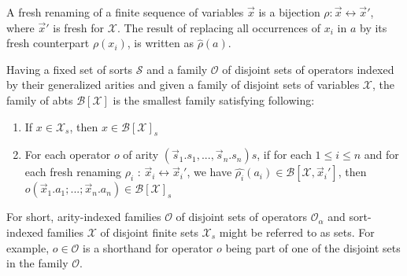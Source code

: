 A fresh renaming of a finite sequence of variables $\vec{x}$ is a bijection $\rho: \vec{x} \leftrightarrow \vec{x}'$, where $\vec{x}'$ is fresh for $\mathcal{X}$. The result of replacing all occurrences of $x_i$ in $a$ by its fresh counterpart $\rho(x_i)$, is written as $\hat{\rho}(a)$.

Having a fixed set of sorts $\mathcal{S}$ and a family $\mathcal{O}$ of disjoint sets of operators indexed by their generalized arities and given a family of disjoint sets of variables $\mathcal{X}$, the family of abts $\mathcal{B}[\mathcal{X}]$ is the smallest family satisfying following:

\begin{enumerate}
    \item If $x \in \mathcal{X}_s$, then $x \in \mathcal{B}[\mathcal{X}]_s$
    \item For each operator $o$ of arity $(\vec{s}_1.s_1,...,\vec{s}_n.s_n)s$, if for each $1 \leq i \leq n$ and for each fresh renaming $\rho_i$ : $\vec{x}_i \leftrightarrow \vec{x}_i'$, we have $\hat{\rho_i}(a_i) \in \mathcal{B}[\mathcal{X}, \vec{x}_i']$, then $o(\vec{x}_1.a_1;...;\vec{x}_n.a_n) \in \mathcal{B}[\mathcal{X}]_s$
\end{enumerate}

For short, arity-indexed families $\mathcal{O}$ of disjoint sets of operators $\mathcal{O}_\alpha$ and sort-indexed families $\mathcal{X}$ of disjoint finite sets $\mathcal{X}_s$ might be referred to as sets. For example, $o \in \mathcal{O}$ is a shorthand for operator $o$ being part of one of the disjoint sets in the family $\mathcal{O}$.